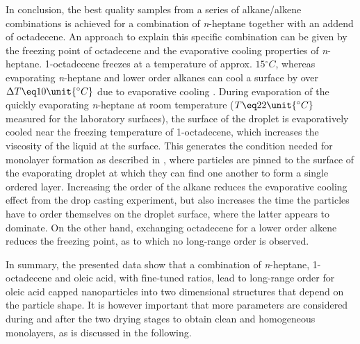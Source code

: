 \documentclass[\main/dresen_thesis.tex]{subfiles}
\begin{document}
  In conclusion, the best quality samples from a series of alkane/alkene combinations is achieved for a combination of \textit{n}-heptane together with an addend of octadecene.
  An approach to explain this specific combination can be given by the freezing point of octadecene and the evaporative cooling properties of \textit{n}-heptane.
  1-octadecene freezes at a temperature of approx. $15 \unit{^\circ C}$, whereas evaporating \textit{n}-heptane and lower order alkanes can cool a surface by over $\Delta T \eq 10 \unit{^\circ C}$ due to evaporative cooling \cite{Tuckermann_2002_Evapo}.
  During evaporation of the quickly evaporating \textit{n}-heptane at room temperature ($T \eq 22 \unit{^\circ C}$ measured for the laboratory surfaces), the surface of the droplet is evaporatively cooled near the freezing temperature of 1-octadecene, which increases the viscosity of the liquid at the surface.
  This generates the condition needed for monolayer formation as described in \cite{Bigioni_2006_Kinet}, where particles are pinned to the surface of the evaporating droplet at which they can find one another to form a single ordered layer.
  Increasing the order of the alkane reduces the evaporative cooling effect from the drop casting experiment, but also increases the time the particles have to order themselves on the droplet surface, where the latter appears to dominate.
  On the other hand, exchanging octadecene for a lower order alkene reduces the freezing point, as to which no long-range order is observed.

  In summary, the presented data show that a combination of \textit{n}-heptane, 1-octadecene and oleic acid, with fine-tuned ratios, lead to long-range order for oleic acid capped nanoparticles into two dimensional structures that depend on the particle shape.
  It is however important that more parameters are considered during and after the two drying stages to obtain clean and homogeneous monolayers, as is discussed in the following.
\end{document}
